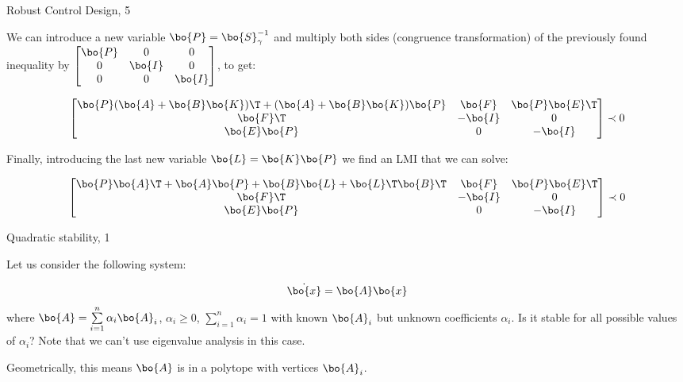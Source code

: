 \documentclass{beamer}
\begin{document}
\begin{frame}{Robust Control Design, 5}
	\begin{flushleft}
		
		We can introduce a new variable $\bo{P} = \bo{S}^{-1}_\gamma$ and multiply both sides (congruence transformation) of the previously found inequality by $\begin{bmatrix}
			\bo{P} & 0 & 0 \\
			0 & \bo{I} & 0 \\
			0 & 0 & \bo{I}
		\end{bmatrix}$, to get:
		
		\begin{equation}
			\begin{bmatrix}
				\bo{P}(\bo{A} + \bo{B}\bo{K})\T + (\bo{A} + \bo{B}\bo{K})\bo{P} & \bo{F} & \bo{P}\bo{E}\T \\
				\bo{F}\T & -\bo{I} & 0 \\
				\bo{E}\bo{P} & 0 & -\bo{I}
			\end{bmatrix} 
			\prec 0
		\end{equation}	
		
		Finally, introducing the last new variable $\bo{L} = \bo{K}\bo{P}$ we find an LMI that we can solve:
		
		\begin{equation}
			\begin{bmatrix}
				\bo{P}\bo{A}\T + \bo{A}\bo{P} + \bo{B}\bo{L} + \bo{L}\T \bo{B}\T & \bo{F} & \bo{P}\bo{E}\T \\
				\bo{F}\T & -\bo{I} & 0 \\
				\bo{E}\bo{P} & 0 & -\bo{I}
			\end{bmatrix} 
			\prec 0
		\end{equation}
		
		
	\end{flushleft}
\end{frame}







\begin{frame}{Quadratic stability, 1}
	\begin{flushleft}
		
		Let us consider the following system:
		
		\begin{equation}
			\dot{\bo{x}}  = \bo{A}\bo{x}
		\end{equation}
		where $\bo{A} = \sum\limits_{i=1}^{n} \alpha_i \bo{A}_i$, $\alpha_i \geq 0$, $\sum\limits_{i=1}^{n} \alpha_i = 1$ with known $\bo{A}_i$ but unknown coefficients $\alpha_i$. Is it stable for all possible values of $\alpha_i$? Note that we can't use eigenvalue analysis in this case.
		
		\bigskip
		
		Geometrically, this means $\bo{A}$ is in a polytope with vertices $\bo{A}_i$.
		
	\end{flushleft}
\end{frame}
\end{document}
